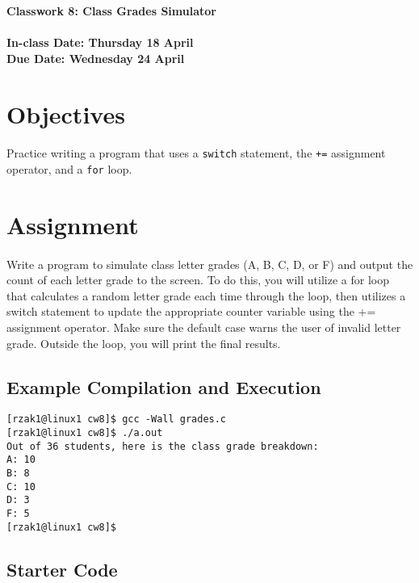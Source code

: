 \documentclass[letter,11pt]{article}
\begin{document}
\huge
\textbf{Classwork 8: Class Grades Simulator}
\normalsize
\\ ~~ \\
\textbf{In-class Date: Thursday 18 April} \\
\textbf{Due Date: Wednesday 24 April}

\section*{Objectives}
\paragraph{}Practice writing a program that uses a \texttt{switch} statement, the \texttt{+=} assignment operator, and a \texttt{for} loop.

\section*{Assignment}
\paragraph{}Write a program to simulate class letter grades (A, B, C, D, or F) and output the count of each letter grade to the screen. To do this, you will utilize a for loop that calculates a random letter grade each time through the loop, then utilizes a switch statement to update the appropriate counter variable using the += assignment operator. Make sure the default case warns the user of invalid letter grade. Outside the loop, you will print the final results.

\subsection*{Example Compilation and Execution}
\begin{verbatim}
[rzak1@linux1 cw8]$ gcc -Wall grades.c
[rzak1@linux1 cw8]$ ./a.out
Out of 36 students, here is the class grade breakdown:
A: 10
B: 8
C: 10
D: 3
F: 5
[rzak1@linux1 cw8]$ 
\end{verbatim}

\subsection*{Starter Code}
\end{document}
